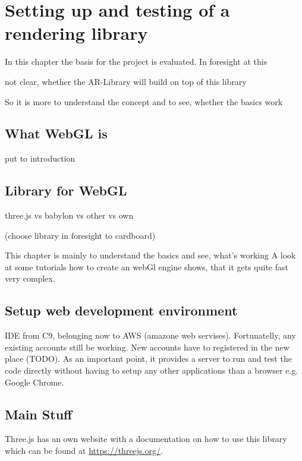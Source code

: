\chapter{Setting up and testing of a rendering library}

In this chapter the basis for the project is evaluated. In foresight at this 

not clear, whether the AR-Library will build on top of this library

So it is more to understand the concept and to see, whether the basics work

\section{What WebGL is}
put to introduction

\section{Library for WebGL}
three.js vs babylon vs other vs own

(choose library in foresight to cardboard)


This chapter is mainly to understand the basics and see, what’s working
A look at some tutorials how to create an webGl engine shows, that it gets quite fast very complex.


\section{Setup web development environment}

IDE from C9, belonging now to AWS (amazone web servises). Fortunatelly, any existing accounts still be working. New accounts have to registered in the new place (TODO). As an important point, it provides a server to run and test the code directly without having to setup any other applications than a browser e.g. Google Chrome. 


\section{Main Stuff}

Three.js has an own website with a documentation on how to use this library which can be found at \url{https://threejs.org/}.
